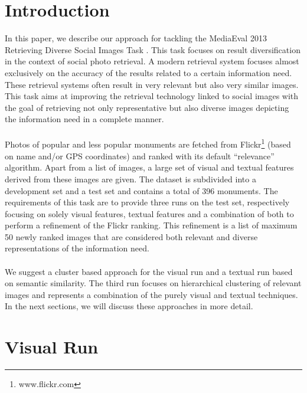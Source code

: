 \documentclass{acm_proc_article-me11_tweaked}
\begin{document}
\section{Introduction}
In this paper, we describe our approach for tackling the MediaEval 2013 Retrieving Diverse Social Images Task \cite{mediaeval-diversephotos}.
This task focuses on result diversification in the context of social photo retrieval. 
A modern retrieval system focuses almost exclusively on the accuracy of the results related to a certain information need. 
These retrieval systems often result in very relevant but also very similar images.
This task aims at improving the retrieval technology linked to social images with the goal of retrieving not only representative but also diverse images depicting the information need in a complete manner.
\\\\
Photos of popular and less popular monuments are fetched from Flickr\footnote{www.flickr.com} (based on name and/or GPS coordinates) and ranked with its default ``relevance'' algorithm.
Apart from a list of images, a large set of visual and textual features derived from these images are given.
The dataset is subdivided into a development set and a test set and contains a total of 396 monuments.
The requirements of this task are to provide three runs on the test set, respectively focusing on solely visual features, textual features and a combination of both to perform a refinement of the Flickr ranking.
This refinement is a list of maximum 50 newly ranked images that are considered both relevant and diverse representations of the information need.
\\\\
We suggest a cluster based approach for the visual run and a textual run based on semantic similarity.
The third run focuses on hierarchical clustering of relevant images and represents a combination of the purely visual and textual techniques.
In the next sections, we will discuss these approaches in more detail.

\section{Visual Run}
\label{visual-similarity}

\end{document}
